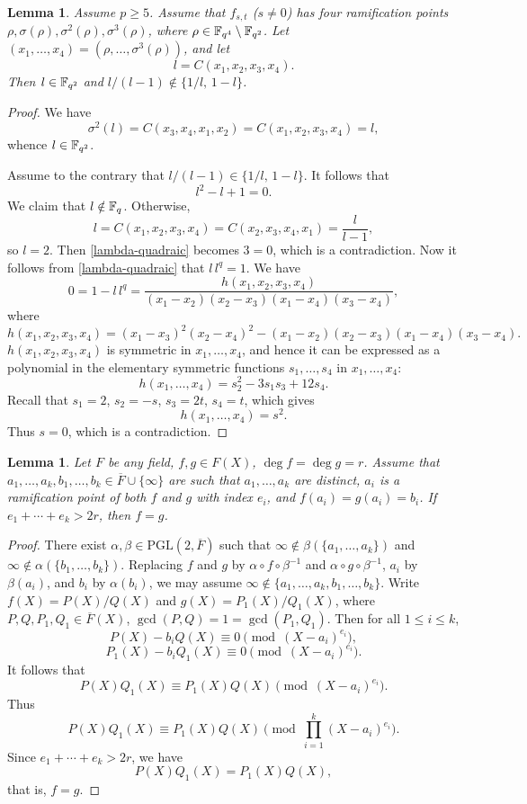 \documentclass{amsart}
\newtheorem{lem}[thm]{Lemma}
\numberwithin{equation}{section}
\theoremstyle{definition}
\newcommand{\f}{\Bbb F}
\newcommand{\pgl}{\mathrm{PGL}}
\begin{document}
\begin{lem}\label{L6.2}
Assume $p\ge 5$. Assume that $f_{s,t}$ ($s\ne 0$) has four ramification points $\rho,\sigma(\rho),\sigma^2(\rho),\sigma^3(\rho)$, where $\rho\in\f_{q^4}\setminus\f_{q^2}$. Let $(x_1,\dots,x_4)=(\rho,\dots,\sigma^3(\rho))$, and let
\[
l=C(x_1,x_2,x_3,x_4).
\]
Then $l\in\f_{q^2}$ and $l/(l-1)\notin\{1/l,\,1-l\}$.
\end{lem}

\begin{proof}
We have
\[
\sigma^2(l)=C(x_3,x_4,x_1,x_2)=C(x_1,x_2,x_3,x_4)=l,
\]
whence $l\in\f_{q^2}$.

Assume to the contrary that $l/(l-1)\in\{1/l,\,1-l\}$. It follows that
\begin{equation}\label{lambda-quadraic}
l^2-l+1=0.
\end{equation}
We claim that $l\notin\f_q$. Otherwise,
\[
l=C(x_1,x_2,x_3,x_4)=C(x_2,x_3,x_4,x_1)=\frac l{l-1},
\]
so $l=2$. Then \eqref{lambda-quadraic} becomes $3=0$, which is a contradiction. Now it follows from \eqref{lambda-quadraic} that $l\,l^q=1$. We have
\[
0=1-l\,l^q=\frac{h(x_1,x_2,x_3,x_4)}{(x_1-x_2)(x_2-x_3)(x_1-x_4)(x_3-x_4)},
\]
where
\[
h(x_1,x_2,x_3,x_4)=(x_1-x_3)^2(x_2-x_4)^2-(x_1-x_2)(x_2-x_3)(x_1-x_4)(x_3-x_4).
\]
$h(x_1,x_2,x_3,x_4)$ is symmetric in $x_1,\dots,x_4$, and hence it can be expressed as a polynomial in the elementary symmetric functions $s_1,\dots,s_4$ in $x_1,\dots,x_4$:
\[
h(x_1,\dots,x_4)=s_2^2-3s_1s_3+12s_4.
\]
Recall that $s_1=2$, $s_2=-s$, $s_3=2t$, $s_4=t$, which gives
\[
h(x_1,\dots,x_4)=s^2.
\]
Thus $s=0$, which is a contradiction.
\end{proof}

\begin{lem}\label{T6.1}
Let $F$ be any field, $f,g\in F(X)$, $\deg f=\deg g=r$. Assume that $a_1,\dots,a_k, b_1,\dots,b_k\in \overline F\cup\{\infty\}$ are such that $a_1,\dots,a_k$ are distinct, $a_i$ is a ramification point of both $f$ and $g$ with index $e_i$, and $f(a_i)=g(a_i)=b_i$. If $e_1+\cdots+e_k>2r$, then $f=g$.
\end{lem}

\begin{proof}
There exist $\alpha,\beta\in\pgl(2,\overline F)$ such that $\infty\notin\beta(\{a_1,\dots,a_k\})$ and $\infty\notin\alpha(\{b_1,\dots,b_k\})$. Replacing $f$ and $g$ by $\alpha\circ f\circ\beta^{-1}$ and $\alpha\circ g\circ\beta^{-1}$, $a_i$ by $\beta(a_i)$, and $b_i$ by $\alpha(b_i)$, we may assume $\infty\notin\{a_1,\dots,a_k,b_1,\dots,b_k\}$. Write $f(X)=P(X)/Q(X)$ and $g(X)=P_1(X)/Q_1(X)$, where $P,Q,P_1,Q_1\in\overline F(X)$, $\gcd(P,Q)=1=\gcd(P_1,Q_1)$. Then for all $1\le i\le k$,
\[
P(X)-b_iQ(X)\equiv 0\pmod{(X-a_i)^{e_i}},
\]
\[
P_1(X)-b_iQ_1(X)\equiv 0\pmod{(X-a_i)^{e_i}}.
\]
It follows that
\[
P(X)Q_1(X)\equiv P_1(X)Q(X)\pmod{(X-a_i)^{e_i}}.
\]
Thus
\[
P(X)Q_1(X)\equiv P_1(X)Q(X)\pmod{\prod_{i=1}^k(X-a_i)^{e_i}}.
\]
Since $e_1+\cdots+e_k>2r$, we have
\[
P(X)Q_1(X)=P_1(X)Q(X),
\]
that is, $f=g$.
\end{proof}
\end{document}
